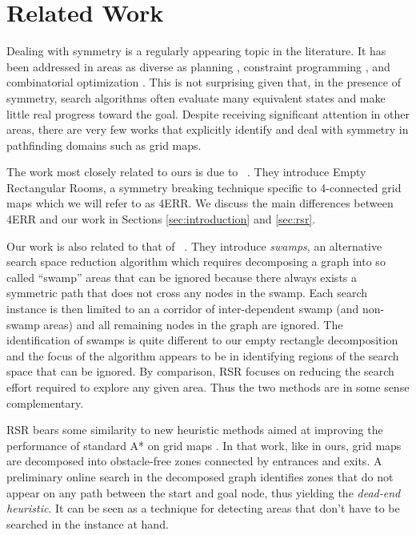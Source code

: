 \section{Related Work}
\label{sec:relatedwork}
Dealing with symmetry is a regularly appearing topic in the literature.  It has
been addressed in areas as diverse as planning \cite{fox99}, constraint programming
\cite{gent00}, and combinatorial optimization \cite{fukunaga08}.  This is not
surprising given that, in the presence of symmetry, search algorithms often
evaluate many equivalent states and make little real progress toward the goal.
Despite receiving significant attention in other areas, there are very few
works that explicitly identify and deal with symmetry in pathfinding domains 
such as grid maps. 
\par
The work most closely related to ours is due to
\citeauthor{harabor10}~.  They introduce Empty Rectangular
Rooms, a symmetry breaking technique specific to 4-connected grid maps which we
will refer to as 4ERR.  We discuss the main differences between 4ERR and our
work in Sections \ref{sec:introduction} and \ref{sec:rsr}.
\par
Our work is also related to that of
\citeauthor{pochter10}~.  They introduce \emph{swamps}, an
alternative search space reduction algorithm which requires decomposing a graph
into so called ``swamp'' areas that can be ignored because there always exists a
symmetric path that does not cross any nodes in the swamp.  Each search instance
is then limited to an a corridor of inter-dependent swamp (and non-swamp areas)
and all remaining nodes in the graph are ignored.  The identification of swamps
is quite different to our empty rectangle decomposition and the focus of the
algorithm appears to be in identifying regions of the search space that can be
ignored.  By comparison, RSR focuses on reducing the search effort required to
explore any given area.
Thus the two methods are in some sense complementary.
\par
RSR bears some similarity to new heuristic methods aimed at improving the
performance of standard A* on grid maps \cite{bjornsson06}.  In that work, like
in ours, grid maps are decomposed into obstacle-free zones connected by
entrances and exits.  A preliminary online search in the decomposed graph
identifies zones that do not appear on any path between the start and goal node,
thus yielding the \emph{dead-end heuristic}.  It can be seen as a technique for
detecting areas that don't have to be searched in the instance at hand.

